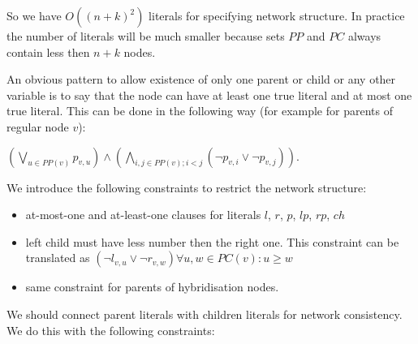 \documentclass[runningheads, envcountsame, a4paper]{llncs}
\begin{document}
So we have $O((n + k) ^ 2)$ literals for specifying network structure. In practice the number of literals will be much smaller because sets $PP$ and $PC$ always contain less then $n+k$ nodes.

An obvious pattern to allow existence of only one parent or child or any other variable is to say that the node can have at least one true literal and at most one true literal. This can be done in the following way (for example for parents of regular node $v$):

$(\bigvee\limits_{u \in PP(v)} p_{v,u}) \wedge (\bigwedge\limits_{i, j \in PP(v);i < j} (\neg p_{v,i} \vee \neg p_{v,j}))$.

We introduce the following constraints to restrict the network structure:

\begin{itemize}

\item at-most-one and at-least-one clauses for literals $l$, $r$, $p$, $lp$, $rp$, $ch$

\item left child must have less number then the right one. This constraint can be translated as 
      $(\neg l_{v,u} \vee \neg r_{v,w}) \forall u, w \in PC(v): u \geq w$
      
\item same constraint for parents of hybridisation nodes.

\end{itemize}

We should connect parent literals with children literals for network consistency. We do this with the following constraints:
\end{document}
